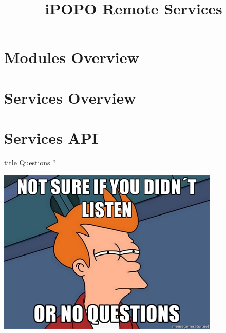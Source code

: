 \documentclass{beamer}
\title[Remote Services]{iPOPO Remote Services}
\begin{document}
\frame{\titlepage}

\section{Modules Overview}


\section{Services Overview}


\section{Services API}


\begin{frame}
  \vfill
  \centering
  \begin{beamercolorbox}[sep=8pt,center,shadow=true,rounded=true]{title}
    Questions ?\par%
  \end{beamercolorbox}
  \vspace{3ex}
  \includegraphics[width=.5\textwidth]{../imgs/questions_fry}
  \vfill
\end{frame}
\end{document}

